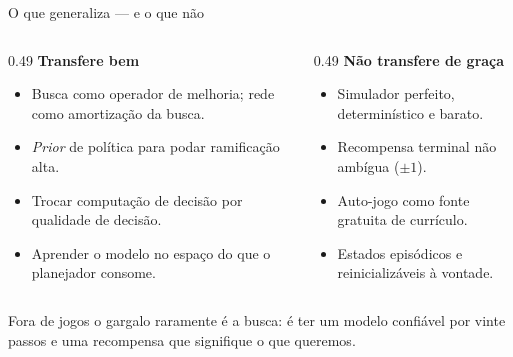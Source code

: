 \documentclass[aspectratio=169, 11pt]{beamer}
\begin{document}
\begin{frame}{O que generaliza --- e o que não}
  \begin{columns}[T]
    \begin{column}{0.49\textwidth}
      \textbf{\color{rlVerde!70!black}Transfere bem}
      \begin{itemize}\setlength{\itemsep}{0.2ex}
        \item Busca como operador de melhoria; rede como amortização da busca.
        \item \emph{Prior} de política para podar ramificação alta.
        \item Trocar computação de decisão por qualidade de decisão.
        \item Aprender o modelo no espaço do que o planejador consome.
      \end{itemize}
    \end{column}
    \begin{column}{0.49\textwidth}
      \textbf{\color{rlVermelho}Não transfere de graça}
      \begin{itemize}\setlength{\itemsep}{0.2ex}
        \item Simulador perfeito, determinístico e barato.
        \item Recompensa terminal não ambígua ($\pm1$).
        \item Auto-jogo como fonte gratuita de currículo.
        \item Estados episódicos e reinicializáveis à vontade.
      \end{itemize}
    \end{column}
  \end{columns}

  \vspace{0.2em}
  \begin{alertabox}
    Fora de jogos o gargalo raramente é a busca: é ter um modelo confiável por
    vinte passos e uma recompensa que signifique o que queremos.
  \end{alertabox}
\end{frame}
\end{document}
